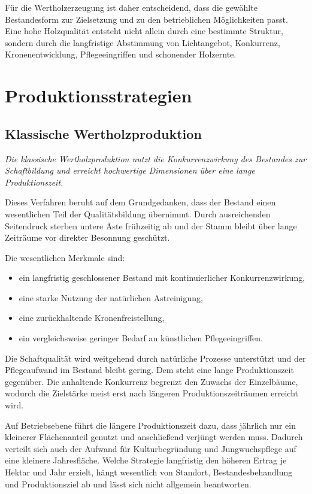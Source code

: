 \documentclass[twocolumn, bibliography=totoc, abstract=true]{scrartcl}
\begin{document}
Für die Wertholzerzeugung ist daher entscheidend, dass die gewählte Bestandesform zur Zielsetzung und zu den betrieblichen Möglichkeiten passt. Eine hohe Holzqualität entsteht nicht allein durch eine bestimmte Struktur, sondern durch die langfristige Abstimmung von Lichtangebot, Konkurrenz, Kronenentwicklung, Pflegeeingriffen und schonender Holzernte.


\section{Produktionsstrategien}

\subsection{Klassische Wertholzproduktion}

\emph{Die klassische Wertholzproduktion nutzt die Konkurrenzwirkung des Bestandes zur Schaftbildung und erreicht hochwertige Dimensionen über eine lange Produktionszeit.}

Dieses Verfahren beruht auf dem Grundgedanken, dass der Bestand einen wesentlichen Teil der Qualitätsbildung übernimmt. Durch ausreichenden Seitendruck sterben untere Äste frühzeitig ab und der Stamm bleibt über lange Zeiträume vor direkter Besonnung geschützt.

Die wesentlichen Merkmale sind:

\begin{itemize}
\item ein langfristig geschlossener Bestand mit kontinuierlicher Konkurrenzwirkung,
\item eine starke Nutzung der natürlichen Astreinigung,
\item eine zurückhaltende Kronenfreistellung,
\item ein vergleichsweise geringer Bedarf an künstlichen Pflegeeingriffen.
\end{itemize}

Die Schaftqualität wird weitgehend durch natürliche Prozesse unterstützt und der Pflegeaufwand im Bestand bleibt gering. Dem steht eine lange Produktionszeit gegenüber. Die anhaltende Konkurrenz begrenzt den Zuwachs der Einzelbäume, wodurch die Zielstärke meist erst nach längeren Produktionszeiträumen erreicht wird.

Auf Betriebsebene führt die längere Produktionszeit dazu, dass jährlich nur ein kleinerer Flächenanteil genutzt und anschließend verjüngt werden muss. Dadurch verteilt sich auch der Aufwand für Kulturbegründung und Jungwuchspflege auf eine kleinere Jahresfläche. Welche Strategie langfristig den höheren Ertrag je Hektar und Jahr erzielt, hängt wesentlich von Standort, Bestandesbehandlung und Produktionsziel ab und lässt sich nicht allgemein beantworten.
\end{document}
